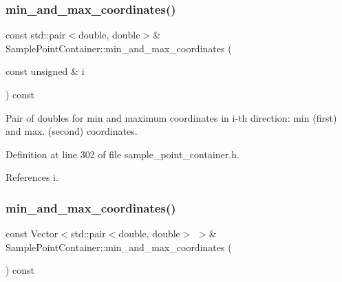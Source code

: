 \mbox{\label{classSamplePointContainer_a6799027f7c569176934457b17bfddf0f}} 
\subsubsection{\texorpdfstring{min\+\_\+and\+\_\+max\+\_\+coordinates()}{min\_and\_max\_coordinates()}\hspace{0.1cm}{\footnotesize\ttfamily [1/2]}}
{\footnotesize\ttfamily const std\+::pair$<$double, double$>$\& Sample\+Point\+Container\+::min\+\_\+and\+\_\+max\+\_\+coordinates (\begin{DoxyParamCaption}\item[{const unsigned \&}]{i }\end{DoxyParamCaption}) const\hspace{0.3cm}{\ttfamily [inline]}}



Pair of doubles for min and maximum coordinates in i-\/th direction\+: min (first) and max. (second) coordinates. 



Definition at line 302 of file sample\+\_\+point\+\_\+container.\+h.



References i.

\mbox{\label{classSamplePointContainer_a6aaae3b3713a9b1d53182d58fc6050df}} 
\subsubsection{\texorpdfstring{min\+\_\+and\+\_\+max\+\_\+coordinates()}{min\_and\_max\_coordinates()}\hspace{0.1cm}{\footnotesize\ttfamily [2/2]}}
{\footnotesize\ttfamily const Vector$<$std\+::pair$<$double, double$>$ $>$\& Sample\+Point\+Container\+::min\+\_\+and\+\_\+max\+\_\+coordinates (\begin{DoxyParamCaption}{ }\end{DoxyParamCaption}) const\hspace{0.3cm}{\ttfamily [inline]}}



